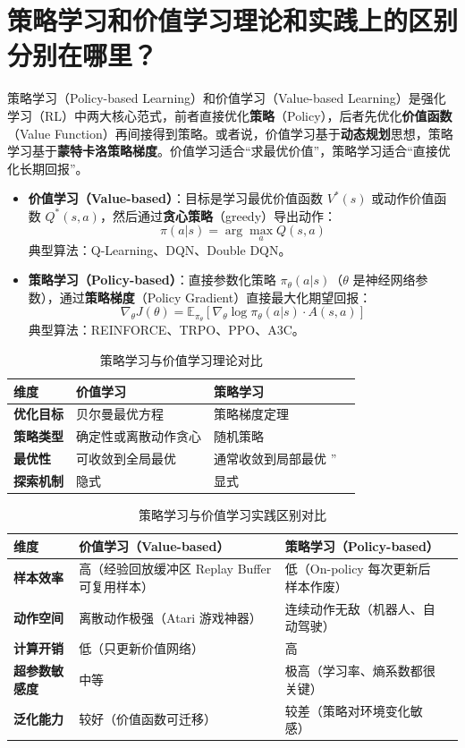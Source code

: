 \documentclass[12pt,a4paper,UTF8]{ctexart}
\begin{document}
\section{策略学习和价值学习理论和实践上的区别分别在哪里？}
策略学习（Policy-based Learning）和价值学习（Value-based Learning）是强化学习（RL）中两大核心范式，前者直接优化\textbf{策略}（Policy），后者先优化\textbf{价值函数}（Value Function）再间接得到策略。或者说，价值学习基于\textbf{动态规划}思想，策略学习基于\textbf{蒙特卡洛策略梯度}。价值学习适合“求最优价值”，策略学习适合“直接优化长期回报”。
\begin{itemize}
    \item \textbf{价值学习（Value-based）}：目标是学习最优价值函数 \( V^*(s) \) 或动作价值函数 \( Q^*(s,a) \)，然后通过\textbf{贪心策略}（greedy）导出动作：
    \[
    \pi(a|s) = \arg\max_a Q(s,a)
    \]
    典型算法：Q-Learning、DQN、Double DQN。
    \item \textbf{策略学习（Policy-based）}：直接参数化策略 \( \pi_\theta(a|s) \)（\(\theta\) 是神经网络参数），通过\textbf{策略梯度}（Policy Gradient）直接最大化期望回报：
    \[
    \nabla_\theta J(\theta) = \mathbb{E}_{\pi_\theta} \left[ \nabla_\theta \log \pi_\theta(a|s) \cdot A(s,a) \right]
    \]
    典型算法：REINFORCE、TRPO、PPO、A3C。
\end{itemize}
\begin{table}[htbp]
\centering
\begin{tabular}{p{1.5cm}p{3cm}p{3cm}c}
\toprule
维度 & 价值学习& 策略学习 \\
\midrule
\textbf{优化目标} & 贝尔曼最优方程 & 策略梯度定理  \\
\textbf{策略类型} & 确定性或离散动作贪心 & 随机策略 \\
\textbf{最优性} & 可收敛到全局最优 & 通常收敛到局部最优 ” \\
\textbf{探索机制} & 隐式 & 显式  \\
\bottomrule
\end{tabular}
\caption{策略学习与价值学习理论对比}
\end{table}
\begin{table}[htbp]
\centering
\begin{tabular}{p{3.2cm}p{5.2cm}p{5.2cm}c}
\toprule
维度 & 价值学习（Value-based） & 策略学习（Policy-based） \\
\midrule
\textbf{样本效率} & 高（经验回放缓冲区 Replay Buffer 可复用样本） & 低（On-policy 每次更新后样本作废）\\
\textbf{动作空间} & 离散动作极强（Atari 游戏神器） & 连续动作无敌（机器人、自动驾驶）  \\
\textbf{计算开销} & 低（只更新价值网络） & 高 \\
\textbf{超参数敏感度} & 中等 & 极高（学习率、熵系数都很关键）\\
\textbf{泛化能力} & 较好（价值函数可迁移） & 较差（策略对环境变化敏感）  \\
\bottomrule
\end{tabular}
\caption{策略学习与价值学习实践区别对比}
\label{tab:practice}
\end{table}
\end{document}

